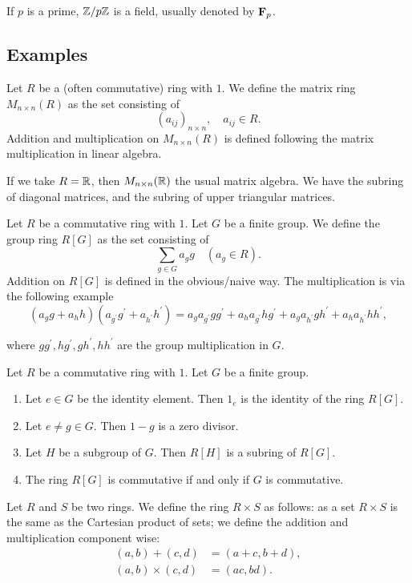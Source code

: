 \begin{corollary}
If $p$ is a prime, $\mathbb Z/p\mathbb Z$ is a field, usually denoted by $\mathbf F_p$.
\end{corollary}

\subsection{Examples}
\begin{example}
Let $R$ be a (often commutative) ring with $1$. We define the matrix ring $M_{n\times n}(R)$ as the set consisting of
\[(a_{ij})_{n\times n},\quad a_{ij}\in R.\]
Addition and multiplication on $M_{n\times n}(R)$ is defined following the matrix multiplication in linear algebra.

If we take $R=\mathbb R$, then $M_{n\times n}(\mathbb R)$ the usual matrix algebra. We have the subring of diagonal matrices, and the subring of upper triangular matrices.
\end{example}

\begin{example}
Let $R$ be a commutative ring with $1$. Let $G$ be a finite group. We define the group ring $R[G]$ as the set consisting of
\[\sum_{g\in G}a_g g\quad(a_g\in R).\]
Addition on $R[G]$ is defined in the obvious/naive way. The multiplication is via the following example
\[(a_g g+a_h h)(a_{g^\prime}g^\prime+a_{h^\prime}h^\prime)=a_g a_{g^\prime}gg^\prime+a_h a_{g^\prime}hg^\prime+a_g a_{h^\prime}gh^\prime+a_h a_{h^\prime}hh^\prime,\]

where $gg^\prime, hg^\prime, gh^\prime, hh^\prime$ are the group multiplication in $G$.

\begin{lemma*}
Let $R$ be a commutative ring with $1$. Let $G$ be a finite group.
\begin{enumerate}[label=(\roman*)]
\item Let $e\in G$ be the identity element. Then $1_e$ is the identity of the ring $R[G]$.
\item Let $e\neq g\in G$. Then $1-g$ is a zero divisor.
\item Let $H$ be a subgroup of $G$. Then $R[H]$ is a subring of $R[G]$.
\item The ring $R[G]$ is commutative if and only if $G$ is commutative.
\end{enumerate}
\end{lemma*}
\end{example}

\begin{example}
Let $R$ and $S$ be two rings. We define the ring $R\times S$ as follows: as a set $R\times S$ is the same as the Cartesian product of sets; we define the addition and multiplication component wise:
\begin{align*}
(a,b)+(c,d)&=(a+c,b+d),\\
(a,b)\times(c,d)&=(ac,bd).
\end{align*}
\end{example}
\pagebreak

